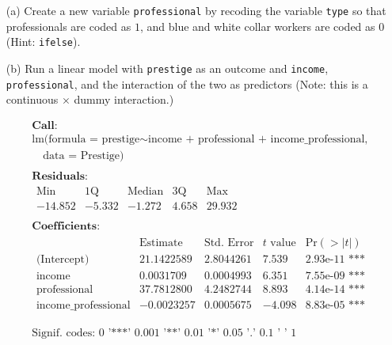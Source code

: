 \documentclass[12pt,letterpaper]{article}
\begin{document}
\newpage
\begin{enumerate}
	
	\item [(a)]
	Create a new variable \texttt{professional} by recoding the variable \texttt{type} so that professionals are coded as $1$, and blue and white collar workers are coded as $0$ (Hint: \texttt{ifelse}).
	
	\vspace{.5cm}
	
	
	
	
	\item [(b)]
	Run a linear model with \texttt{prestige} as an outcome and \texttt{income}, \texttt{professional}, and the interaction of the two as predictors (Note: this is a continuous $\times$ dummy interaction.)
	
	\vspace{.5cm}
	
	
	
	$$
	\begin{aligned}
		&\textbf{Call:} \\
		&\text{lm(formula = prestige} \sim \text{income + professional + income\_professional,} \\
		&\quad \text{data = Prestige)} \\
		\\
		&\textbf{Residuals:} \\
		&\begin{array}{lrrrr}
			\text{Min} & \text{1Q} & \text{Median} & \text{3Q} & \text{Max} \\
			-14.852 & -5.332 & -1.272 & 4.658 & 29.932
		\end{array} \\
		\\
		&\textbf{Coefficients:} \\
		&\begin{array}{lrrrr}
			& \text{Estimate} & \text{Std. Error} & t \text{ value} & \text{Pr}(>|t|) \\
			\hline
			\text{(Intercept)} & 21.1422589 & 2.8044261 & 7.539 & 2.93\text{e-}11\text{ ***} \\
			\text{income} & 0.0031709 & 0.0004993 & 6.351 & 7.55\text{e-}09\text{ ***} \\
			\text{professional} & 37.7812800 & 4.2482744 & 8.893 & 4.14\text{e-}14\text{ ***} \\
			\text{income\_professional} & -0.0023257 & 0.0005675 & -4.098 & 8.83\text{e-}05\text{ ***} \\
		\end{array} \\
		\\
		&\text{Signif. codes: 0 '***' 0.001 '**' 0.01 '*' 0.05 '.' 0.1 ' ' 1}
	\end{aligned}
	$$


\end{enumerate}
\end{document}

